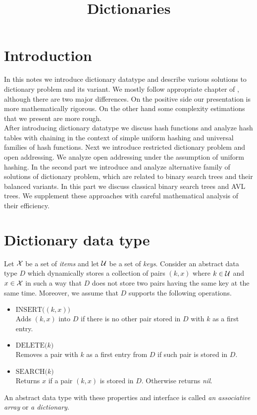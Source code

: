 


\title{Dictionaries}
\date{}
\maketitle

\section{Introduction}
\noindent
In this notes we introduce dictionary datatype and describe various solutions to dictionary problem and its variant. We mostly follow appropriate chapter of \cite{CormenLeisersonRivestStein}, although there are two major differences. On the positive side our presentation is more mathematically rigorous. On the other hand some complexity estimations that we present are more rough.\\
After introducing dictionary datatype we discuss hash functions and analyze hash tables with chaining in the context of simple uniform hashing and universal families of hash functions. Next we introduce restricted dictionary problem and open addressing. We analyze open addressing under the assumption of uniform hashing. In the second part we introduce and analyze alternative family of solutions of dictionary problem, which are related to binary search trees and their balanced variants. In this part we discuss classical binary search trees and AVL trees. We supplement these approaches with careful mathematical analysis of their efficiency.  

\section{Dictionary data type}

\begin{definition}
Let ${\mathcal X}$ be a set of \textit{items} and let ${\mathcal U}$ be a set of \textit{keys}. Consider an abstract data type $D$ which dynamically stores a collection of pairs $(k, x)$ where $k\in {\mathcal U}$ and $x\in {\mathcal X}$ in such a way that $D$ does not store two pairs having the same key at the same time. Moreover, we assume that $D$ supports the following operations.
\begin{itemize}
\item[] $\textrm{INSERT}\big((k,x)\big)$\\
Adds $(k,x)$ into $D$ if there is no other pair stored in $D$ with $k$ as a first entry.
\item[] $\textrm{DELETE}\big(k\big)$\\
Removes a pair with $k$ as a first entry from $D$ if such pair is stored in $D$.
\item[] $\textrm{SEARCH}\big(k\big)$\\
Returns $x$ if a pair $(k,x)$ is stored in $D$. Otherwise returns \textit{nil}. 
\end{itemize}
An abstract data type with these properties and interface is called \textit{an associative array} or \textit{a dictionary}.
\end{definition}

